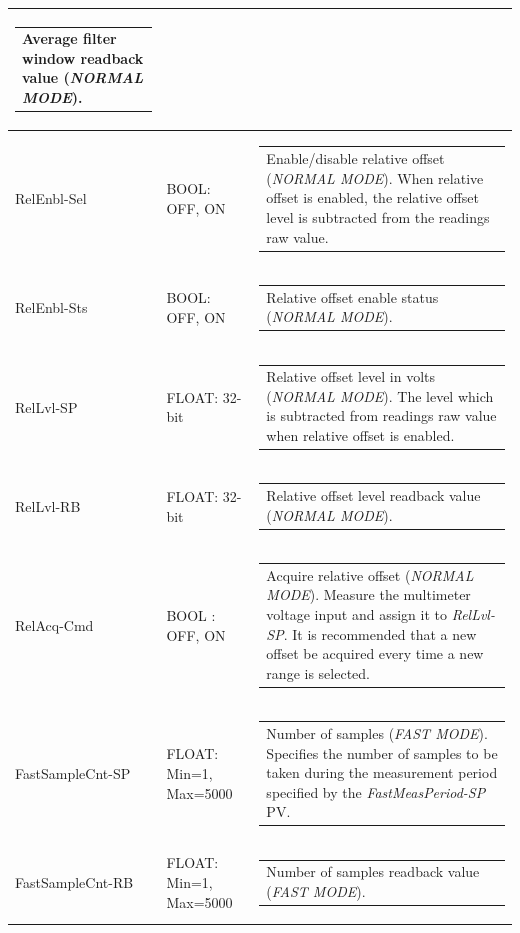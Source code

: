 \documentclass[openany]{article}
\begin{document}
\begin{longtable}{| m{3.0cm} m{4.5cm} m{7.0cm} |}
\begin{tabular}{@{}m{6cm}@{}}
	    					Average filter window readback value (\emph{NORMAL MODE}).
						\end{tabular} \\ \hline
		RelEnbl-Sel & BOOL: OFF, ON & \begin{tabular}{@{}m{6cm}@{}}
	    					Enable/disable relative offset (\emph{NORMAL MODE}). When relative offset is enabled, the relative offset level is subtracted from the readings raw value.
						\end{tabular} \\ \hline
		RelEnbl-Sts & BOOL: OFF, ON & \begin{tabular}{@{}m{6cm}@{}}
	    					Relative offset enable status (\emph{NORMAL MODE}).
						\end{tabular} \\ \hline
		RelLvl-SP & FLOAT: 32-bit & \begin{tabular}{@{}m{6cm}@{}}
	    					Relative offset level in volts (\emph{NORMAL MODE}). The level which is subtracted from readings raw value when relative offset is enabled.
						\end{tabular} \\ \hline
		RelLvl-RB & FLOAT: 32-bit & \begin{tabular}{@{}m{6cm}@{}}
	    					Relative offset level readback value (\emph{NORMAL MODE}).
						\end{tabular} \\ \hline
		RelAcq-Cmd & BOOL : OFF, ON & \begin{tabular}{@{}m{6cm}@{}}
						Acquire relative offset (\emph{NORMAL MODE}). Measure the multimeter voltage input and assign it to \emph{RelLvl-SP}. It is recommended that a new offset be acquired every time a new range is selected.
						\end{tabular} \\ \hline
		FastSampleCnt-SP & FLOAT: Min=1, Max=5000 & \begin{tabular}{@{}m{6cm}@{}}
	    					Number of samples (\emph{FAST MODE}). Specifies the number of samples to be taken during the measurement period specified by the \emph{FastMeasPeriod-SP} PV.
						\end{tabular} \\ \hline
		FastSampleCnt-RB & FLOAT: Min=1, Max=5000 & \begin{tabular}{@{}m{6cm}@{}}
	    					Number of samples readback value (\emph{FAST MODE}).
						\end{tabular} \\ \hline

\end{longtable}
\end{document}
